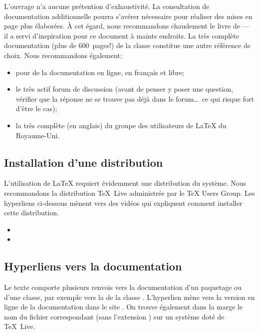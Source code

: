 L'ouvrage n'a aucune prétention d'exhaustivité. La consultation de
documentation additionnelle pourra s'avérer nécessaire pour réaliser
des mises en page plus élaborées. À cet égard, nous recommandons
chaudement le livre de \citet{Kopka:latex:4e} --- il a servi
d'inspiration pour ce document à maints endroits. La très complète
documentation (plus de 600~pages!) de la classe 
\citep{memoir} constitue une autre référence de choix. Nous
recommandons également:
\begin{itemize}
\item {} pour de la documentation en ligne, en français et
  libre;
\item le très actif forum de discussion
  (avant de penser y poser une question, vérifier que la réponse ne se trouve
  pas déjà dans le forum\dots\ ce qui risque fort d'être le cas);
\item la très complète
   (en anglais) du groupe des
  utilisateurs de {\LaTeX} du Royaume-Uni.
\end{itemize}

\subsection*{Installation d'une distribution}

L'utilisation de {\LaTeX} requiert évidemment une distribution du
système. Nous recommandons la distribution {\TeX}~Live administrée par
le {\TeX} Users Group. Les hyperliens ci-dessous mènent vers des
vidéos qui expliquent comment installer cette distribution.
\begin{itemize}
\item {}
\item {}
\end{itemize}

\subsection*{Hyperliens vers la documentation}

Le texte comporte plusieurs renvois vers la documentation d'un
paquetage ou d'une classe, par exemple vers la %
de la classe . L'hyperlien mène vers la version en ligne
de la documentation dans le site %
. On trouve également dans la
marge le nom du fichier correspondant (sans l'extension )
sur un système doté de {\TeX}~Live.

